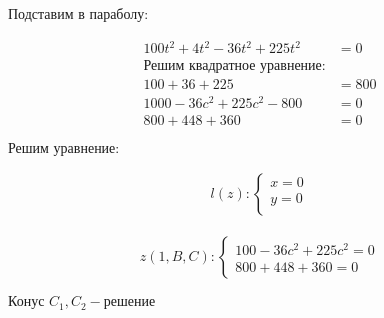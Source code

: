 \documentclass[a4paper,14pt]{extreport} %
\begin{document}
Подставим в параболу:

\begin{align*}
100t^2 + 4t^2 - 36t^2 + 225t^2 &= 0 \\
\text{Решим квадратное уравнение:} \\
100 + 36 + 225 &= 800 \\
1000 - 36c^2 + 225c^2 - 800 &= 0 \\
800 + 448 + 360 &= 0
\end{align*}

$\text{Решим уравнение:} $

\begin{align*}
l(z) : 
\begin{cases}
x = 0 \\
y = 0 \\
\end{cases}
\end{align*}

\begin{align*}
z(1, B, C):
\begin{cases}
100 - 36c^2 + 225c^2 = 0 \\
800 + 448 + 360 = 0
\end{cases}
\end{align*}

$\text{Конус } C_1, C_2 - \text{решение}$
\end{document}
